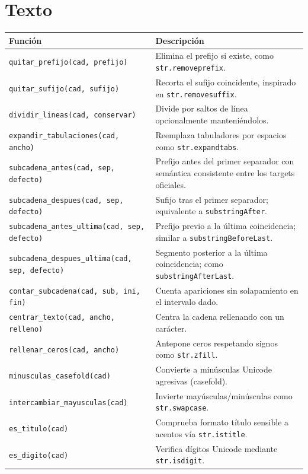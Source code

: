 \documentclass{article}
\begin{document}
\section*{Texto}
\begin{tabular}{ll}
\textbf{Función} & \textbf{Descripción}\\\hline
\texttt{quitar\_prefijo(cad, prefijo)} & Elimina el prefijo si existe, como \texttt{str.removeprefix}.\\
\texttt{quitar\_sufijo(cad, sufijo)} & Recorta el sufijo coincidente, inspirado en \texttt{str.removesuffix}.\\
\texttt{dividir\_lineas(cad, conservar)} & Divide por saltos de línea opcionalmente manteniéndolos.\\
\texttt{expandir\_tabulaciones(cad, ancho)} & Reemplaza tabuladores por espacios como \texttt{str.expandtabs}.\\
\texttt{subcadena\_antes(cad, sep, defecto)} & Prefijo antes del primer separador con semántica consistente entre los targets oficiales.\\
\texttt{subcadena\_despues(cad, sep, defecto)} & Sufijo tras el primer separador; equivalente a \texttt{substringAfter}.\\
\texttt{subcadena\_antes\_ultima(cad, sep, defecto)} & Prefijo previo a la última coincidencia; similar a \texttt{substringBeforeLast}.\\
\texttt{subcadena\_despues\_ultima(cad, sep, defecto)} & Segmento posterior a la última coincidencia; como \texttt{substringAfterLast}.\\
\texttt{contar\_subcadena(cad, sub, ini, fin)} & Cuenta apariciones sin solapamiento en el intervalo dado.\\
\texttt{centrar\_texto(cad, ancho, relleno)} & Centra la cadena rellenando con un carácter.\\
\texttt{rellenar\_ceros(cad, ancho)} & Antepone ceros respetando signos como \texttt{str.zfill}.\\
\texttt{minusculas\_casefold(cad)} & Convierte a minúsculas Unicode agresivas (casefold).\\
\texttt{intercambiar\_mayusculas(cad)} & Invierte mayúsculas/minúsculas como \texttt{str.swapcase}.\\
\texttt{es\_titulo(cad)} & Comprueba formato título sensible a acentos vía \texttt{str.istitle}.\\
\texttt{es\_digito(cad)} & Verifica dígitos Unicode mediante \texttt{str.isdigit}.\\
\end{tabular}
\end{document}
